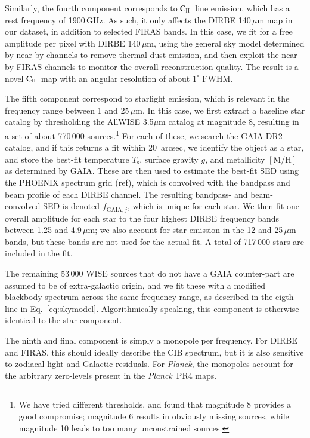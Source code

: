 \documentclass{aa}
\def\Planck{\textit{Planck}}
\newcommand{\CII}{$\mathrm{C}_{\textsc{II}}$}
\begin{document}
Similarly, the fourth component corresponds to \CII\ line emission,
which has a rest frequency of 1900\,GHz. As such, it only affects the
DIRBE 140\,$\mu$m map in our dataset, in addition to selected FIRAS
bands. In this case, we fit for a free amplitude per pixel with DIRBE
140\,$\mu$m, using the general sky model determined by near-by
channels to remove thermal dust emission, and then exploit the near-by
FIRAS channels to monitor the overall reconstruction
quality. The result is a novel \CII\ map with an angular resolution of
about $1^{\circ}$ FWHM.

The fifth component correspond to starlight emission, which is
relevant in the frequency range between 1 and 25\,$\mu$m. In this
case, we first extract a baseline star catalog by thresholding the
AllWISE 3.5$\mu$m catalog at magnitude 8, resulting in a set of about
770\,000 sources.\footnote{We have tried different thresholds, and
found that magnitude 8 provides a good compromise; magnitude 6 results
in obviously missing sources, while magnitude 10 leads to too many
unconstrained sources.} For each of these, we search the GAIA DR2
catalog, and if this returns a fit within 20~arcsec, we identify the
object as a star, and store the best-fit temperature $T_\mathrm{s}$,
surface gravity $g$, and metallicity $[\mathrm{M}/\mathrm{H}]$ as
determined by GAIA. These are then used to estimate the best-fit SED
using the PHOENIX spectrum grid (ref), which is convolved with the
bandpass and beam profile of each DIRBE channel. The resulting
bandpass- and beam-convolved SED is denoted $f_{\mathrm{GAIA},j}$,
which is unique for each star. We then fit one overall amplitude for
each star to the four highest DIRBE frequency bands between 1.25 and
4.9\,$\mu$m; we also account for star emission in the 12 and
25\,$\mu$m bands, but these bands are not used for the actual fit. A
total of 717\,000 stars are included in the fit.

The remaining 53\,000 WISE sources that do not have a GAIA
counter-part are assumed to be of extra-galactic origin, and we fit
these with a modified blackbody spectrum across the same frequency
range, as described in the eigth line in
Eq.~\eqref{eq:skymodel}. Algorithmically speaking, this component is
otherwise identical to the star component.

The ninth and final component is simply a monopole per frequency. For
DIRBE and FIRAS, this should ideally describe the CIB spectrum, but it
is also sensitive to zodiacal light and Galactic residuals. For
\Planck, the monopoles account for the arbitrary zero-levels present
in the \Planck\ PR4 maps.
\end{document}
